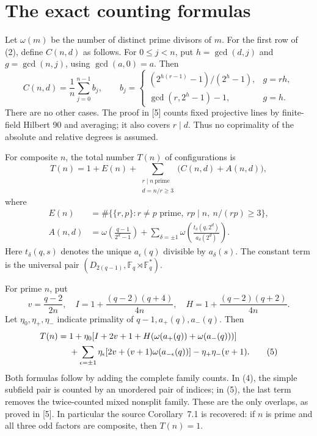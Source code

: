 \documentclass[11pt]{article}
\newcommand{\F}{\mathbb F}
\begin{document}
\section{The exact counting formulas}
Let $\omega(m)$ be the number of distinct prime divisors of $m$. For the
first row of (2), define $C(n,d)$ as follows. For $0\le j<n$, put
$h=\gcd(d,j)$ and $g=\gcd(n,j)$, using $\gcd(a,0)=a$. Then
\[
 C(n,d)=\frac1n\sum_{j=0}^{n-1}b_j,\qquad
 b_j=\begin{cases}
 (2^{h(r-1)}-1)/(2^h-1),&g=rh,\\
 \gcd(r,2^h-1)-1,&g=h.
 \end{cases}                                               \tag{3}
\]
There are no other cases. The proof in [5] counts fixed projective lines
by finite-field Hilbert 90 and averaging; it also covers $r\mid d$.
Thus no coprimality of the absolute and relative degrees is assumed.

For composite $n$, the total number $T(n)$ of configurations is
\[
 T(n)=1+E(n)+\sum_{\substack{r\mid n\ \mathrm{prime}\\d=n/r\ge3}}
                \bigl(C(n,d)+A(n,d)\bigr),                  \tag{4}
\]
where
\begin{align*}
 E(n)&=\#\{\{r,p\}:r\ne p\text{ prime},\ rp\mid n,\ n/(rp)\ge3\},\\
 A(n,d)&=\omega\!\left(\frac{q-1}{2^d-1}\right)
       +\sum_{\delta=\pm1}\omega\!\left(
              \frac{t_\delta(q,2^d)}{a_\delta(2^d)}\right).
\end{align*}
Here $t_\delta(q,s)$ denotes the unique $a_\epsilon(q)$ divisible by
$a_\delta(s)$. The constant term is the universal pair
$(D_{2(q-1)},\F_q\rtimes\F_q^*)$.

For prime $n$, put
\[
 v=\frac{q-2}{2n},\quad I=1+\frac{(q-2)(q+4)}{4n},\quad
 H=1+\frac{(q-2)(q+2)}{4n}.
\]
Let $\eta_0,\eta_+,\eta_-$ indicate primality of $q-1,a_+(q),a_-(q)$.
Then
\begin{align}
T(n)={}&1+\eta_0[I+2v+1+H(\omega(a_+(q))+\omega(a_-(q)))]\notag\\
&+\sum_{\epsilon=\pm1}\eta_\epsilon
 [2v+(v+1)\omega(a_{-\epsilon}(q))]
 -\eta_+\eta_-(v+1).                                    \tag{5}
\end{align}
Both formulas follow by adding the complete family counts. In (4), the
simple subfield pair is counted by an unordered pair of indices; in
(5), the last term removes the twice-counted mixed nonsplit family.
These are the only overlaps, as proved in [5]. In particular the source
Corollary~7.1 is recovered: if $n$ is prime and all three odd factors are
composite, then $T(n)=1$.
\end{document}
